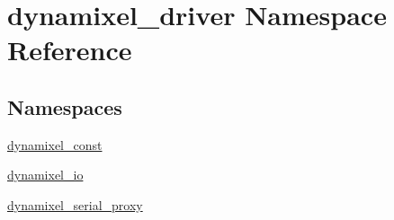 \hypertarget{namespacedynamixel__driver}{}\section{dynamixel\+\_\+driver Namespace Reference}
\label{namespacedynamixel__driver}
\subsection*{Namespaces}
\begin{DoxyCompactItemize}
\item 
 \hyperlink{namespacedynamixel__driver_1_1dynamixel__const}{dynamixel\+\_\+const}
\item 
 \hyperlink{namespacedynamixel__driver_1_1dynamixel__io}{dynamixel\+\_\+io}
\item 
 \hyperlink{namespacedynamixel__driver_1_1dynamixel__serial__proxy}{dynamixel\+\_\+serial\+\_\+proxy}
\end{DoxyCompactItemize}
